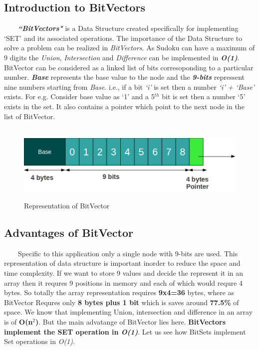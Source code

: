 \documentclass[12pt,a4paper]{article}
\begin{document}
\subsection{Introduction to BitVectors}
\ \ \ \ \textit{\textbf{``BitVectors"}} is a Data Structure created specifically for implementing `SET' and its associated operations. The importance of the Data Structure to solve a problem can be realized in \textit{BitVectors}. As Sudoku can have a maximum of 9 digits the \textit{Union}, \textit{Intersection} and \textit{Difference} can be implemented in \textit{\textbf{O(1)}}. BitVector can be considered as a linked list of bits corresoponding to a particular number. \textit{\textbf{Base}} represents the base value to the node and the \textit{\textbf{9-bits}} repressent nine numbers starting from \textit{Base}. i.e., if a bit \textit{`i'} is set then a number \textit{`i' + `Base'} exists. For e.g. Consider base value as `1' and a 5$^{th}$ bit is set then a number `5' exists in the set. It also contains a pointer which point to the next node in the list of BitVector. 

\begin{figure}[H]
\begin{center}
\ \newline
\includegraphics[scale=.4]{bitvector.png}
\caption{Representation of BitVector}
\end{center}
\end{figure}

\subsection{Advantages of BitVector}
\ \ \ \ Specific to this application only a single node with 9-bits are used. This representation of data structure is important inorder to reduce the space and time complexity. If we want to store 9 values and decide the represent it in an array then it requres 9 positions in memory and each of which would requre 4 bytes. So totally the array representation requires \textbf{9x4=36} bytes, where as BitVector Requres only \textbf{8 bytes plus 1 bit} which is saves around \textbf{77.5\%} of space. We know that implementing Union, intersection and difference in an array is of \textbf{O(n$^2$)}.  But the main advatange of BitVector lies here. \textbf{BitVectors implement the SET operation in \textit{O(1)}}. Let us see how BitSets implement Set operations in \textit{O(1)}.
\end{document}

